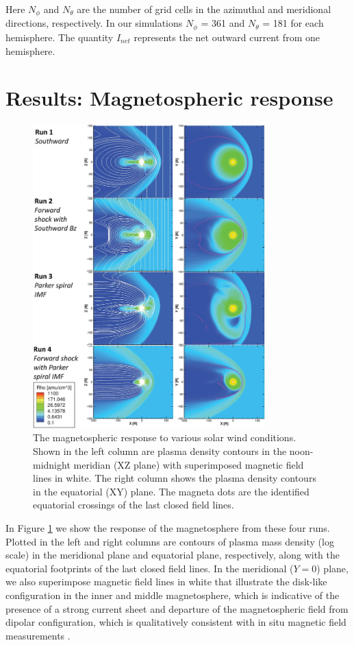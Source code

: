 Here $N_\phi$ and $N_\theta$ are the number of grid cells in the azimuthal and meridional directions, respectively. In our simulations $N_\phi$ = 361 and $N_\theta$ = 181 for each hemisphere. The quantity $I_{net}$ represents the net outward current from one hemisphere.

\section{Results: Magnetospheric response}

\begin{figure}
    \centering
    \includegraphics[width=0.8\textwidth]{images3/mhd-solarwind-upstream.jpg}
    \caption{The magnetospheric response to various solar wind conditions. Shown in the left column are plasma density contours in the noon-midnight meridian (XZ plane) with superimposed magnetic field lines in white. The right column shows the plasma density contours in the equatorial (XY) plane. The magneta dots are the identified equatorial crossings of the last closed field lines.}
    \label{fig:mhd-solarwind-upstream}
\end{figure}

In Figure \ref{fig:mhd-solarwind-upstream} we show the response of the magnetosphere from these four runs. Plotted in the left and right columns are contours of plasma mass density (log scale) in the meridional plane and equatorial plane, respectively, along with the equatorial footprints of the last closed field lines. In the meridional ($Y = 0$) plane, we also superimpose magnetic field lines in white that illustrate the disk‐like configuration in the inner and middle magnetosphere, which is indicative of the presence of a strong current sheet and departure of the magnetospheric field from dipolar configuration, which is qualitatively consistent with in situ magnetic field measurements \cite{Khurana2001}.

